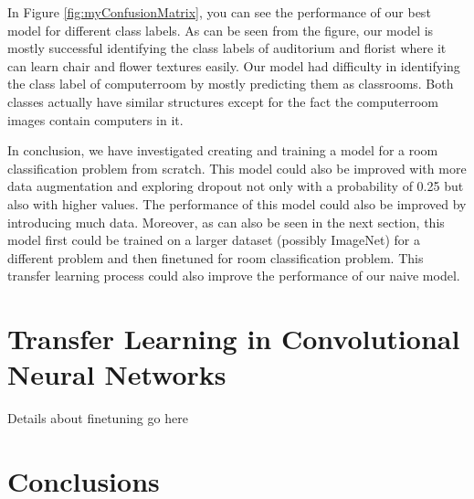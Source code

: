 \documentclass{article}
\begin{document}
In Figure \ref{fig:myConfusionMatrix}, you can see the performance of our best model for different class labels. As can be seen from the figure, our model is mostly successful identifying the class labels of auditorium and florist where it can learn chair and flower textures easily. Our model had difficulty in identifying the class label of computerroom by mostly predicting them as classrooms. Both classes actually have similar structures except for the fact the computerroom images contain computers in it.

In conclusion, we have investigated creating and training a model for a room classification problem from scratch. This model could also be improved with more data augmentation and exploring dropout not only with a probability of 0.25 but also with higher values. The performance of this model could also be improved by introducing much data. Moreover, as can also be seen in the next section, this model first could be trained on a larger dataset (possibly ImageNet) for a different problem and then finetuned for room classification problem. This transfer learning process could also improve the performance of our naive model.

\section{Transfer Learning in Convolutional Neural Networks}

Details about finetuning go here 


\section{Conclusions}
 
{\small


}
\end{document}
